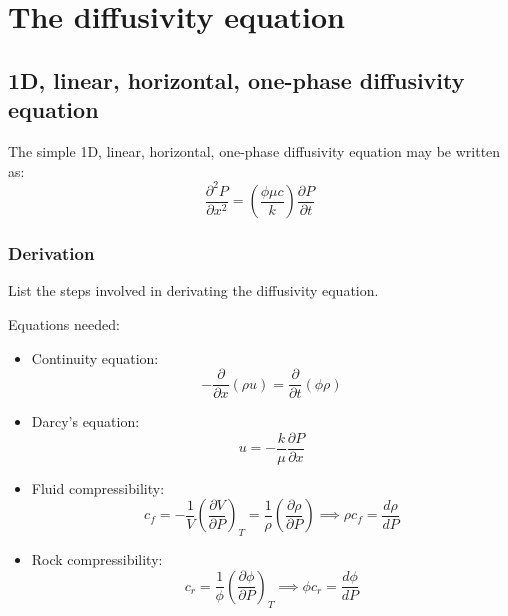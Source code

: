
\section{The diffusivity equation} %
\label{sec:the_diffusivity_equation}

\subsection{1D, linear, horizontal, one-phase diffusivity equation} %
\label{sub:1d_linear_horizontal_one_phase_diffusivity_equation}

\begin{question}
  The simple 1D, linear, horizontal, one-phase diffusivity equation may be written as:
  \begin{equation}
    \frac{\partial^2 P}{\partial x^2} = \left( \frac{\phi \mu c}{k} \right) \frac{\partial P}{\partial t}
  \end{equation}
\end{question}

\subsubsection{Derivation} %
\label{ssub:derivation}

\begin{question}
  List the steps involved in derivating the diffusivity equation.
\end{question}

Equations needed:
\begin{itemize}
  \item Continuity equation:
    \begin{equation}
      - \frac{\partial}{\partial x} (\rho u) = \frac{\partial}{\partial t} (\phi \rho)
    \end{equation}
  \item Darcy's equation:
    \begin{equation}
      u = - \frac{k}{\mu} \frac{\partial P}{\partial x}
    \end{equation}
  \item Fluid compressibility:
    \begin{equation}
      c_f = - \frac{1}{V} \left( \frac{\partial V}{\partial P} \right)_T =
           \frac{1}{\rho} \left( \frac{\partial \rho}{\partial P} \right)
           \implies \rho c_f = \frac{d \rho }{dP}
    \end{equation}
  \item Rock compressibility:
    \begin{equation}
      c_r = \frac{1}{\phi} \left( \frac{\partial\phi}{\partial P} \right)_T
      \implies \phi c_r = \frac{d\phi}{dP}
    \end{equation}
\end{itemize}

